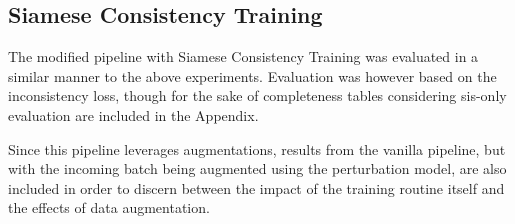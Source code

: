     \subsection{Siamese Consistency Training}
        The modified pipeline with Siamese Consistency Training was evaluated in a similar manner to the above experiments. Evaluation was however based on the inconsistency loss, though for the sake of completeness tables considering \gls{sis}-only evaluation are included in the Appendix. 
        
        Since this pipeline leverages augmentations, results from the vanilla pipeline, but with the incoming batch being augmented using the perturbation model, are also included in order to discern between the impact of the training routine itself and the effects of data augmentation.
        
    
        
        
    
